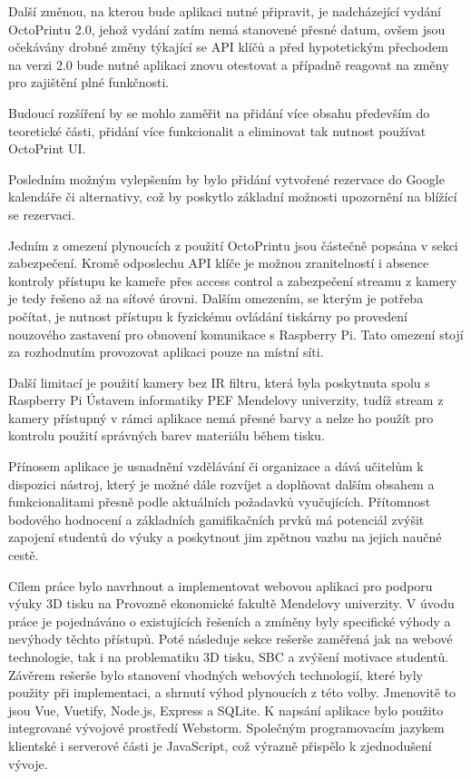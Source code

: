 \documentclass[twoside, 12pt]{article}
\begin{document}
Další změnou, na kterou bude aplikaci nutné připravit, je nadcházející vydání OctoPrintu 2.0, jehož vydání zatím nemá stanovené přesné datum, ovšem jsou očekávány drobné změny týkající se API klíčů a před hypotetickým přechodem na verzi 2.0 bude nutné aplikaci znovu otestovat a případně reagovat na změny pro zajištění plné funkčnosti.

Budoucí rozšíření by se mohlo zaměřit na přidání více obsahu především do teoretické části, přidání více funkcionalit a eliminovat tak nutnost používat OctoPrint UI.

Posledním možným vylepšením by bylo přidání vytvořené rezervace do Google kalendáře či alternativy, což by poskytlo základní možnosti upozornění na blížící se rezervaci.


Jedním z omezení plynoucích z použití OctoPrintu jsou částečně popsána v sekci zabezpečení. Kromě odposlechu API klíče je možnou zranitelností i absence kontroly přístupu ke kameře přes access control a zabezpečení streamu z kamery je tedy řešeno až na síťové úrovni. Dalším omezením, se kterým je potřeba počítat, je nutnost přístupu k fyzickému ovládání tiskárny po provedení nouzového zastavení pro obnovení komunikace s Raspberry Pi. Tato omezení stojí za rozhodnutím provozovat aplikaci pouze na místní síti.

Další limitací je použití kamery bez IR filtru, která byla poskytnuta spolu s Raspberry Pi Ústavem informatiky PEF Mendelovy univerzity, tudíž stream z kamery přístupný v rámci aplikace nemá přesné barvy a nelze ho použít pro kontrolu použití správných barev materiálu během tisku.


Přínosem aplikace je usnadnění vzdělávání či organizace a dává učitelům k dispozici nástroj, který je možné dále rozvíjet a doplňovat dalším obsahem a funkcionalitami přesně podle aktuálních požadavků vyučujících. Přítomnost bodového hodnocení a základních gamifikačních prvků má potenciál zvýšit zapojení studentů do výuky a poskytnout jim zpětnou vazbu na jejich naučné cestě.


Cílem práce bylo navrhnout a implementovat webovou aplikaci pro podporu výuky 3D tisku na Provozně ekonomické fakultě Mendelovy univerzity. V úvodu práce je pojednáváno o existujících řešeních a zmíněny byly specifické výhody a nevýhody těchto přístupů. Poté následuje sekce rešerše zaměřená jak na webové technologie, tak i na problematiku 3D tisku, SBC a zvýšení motivace studentů. Závěrem rešerše bylo stanovení vhodných webových technologií, které byly použity při implementaci, a shrnutí výhod plynoucích z této volby. Jmenovitě to jsou Vue, Vuetify, Node.js, Express a SQLite. K napsání aplikace bylo použito integrované vývojové prostředí Webstorm. Společným programovacím jazykem klientské i serverové části je JavaScript, což výrazně přispělo k zjednodušení vývoje.
\end{document}
